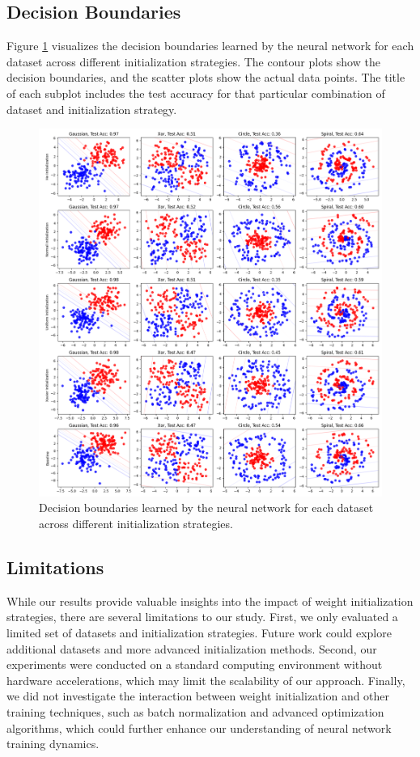 \documentclass{article} %
\begin{document}
\subsection{Decision Boundaries}
Figure \ref{fig:decision_boundaries} visualizes the decision boundaries learned by the neural network for each dataset across different initialization strategies. The contour plots show the decision boundaries, and the scatter plots show the actual data points. The title of each subplot includes the test accuracy for that particular combination of dataset and initialization strategy.

\begin{figure}[h]
    \centering
    \includegraphics[width=\textwidth]{generated_images.png}
    \caption{Decision boundaries learned by the neural network for each dataset across different initialization strategies.}
    \label{fig:decision_boundaries}
\end{figure}

\subsection{Limitations}
While our results provide valuable insights into the impact of weight initialization strategies, there are several limitations to our study. First, we only evaluated a limited set of datasets and initialization strategies. Future work could explore additional datasets and more advanced initialization methods. Second, our experiments were conducted on a standard computing environment without hardware accelerations, which may limit the scalability of our approach. Finally, we did not investigate the interaction between weight initialization and other training techniques, such as batch normalization and advanced optimization algorithms, which could further enhance our understanding of neural network training dynamics.
\end{document}

